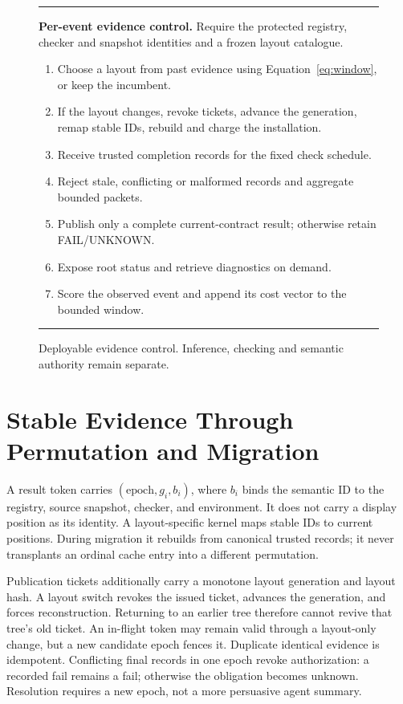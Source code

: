 \documentclass[11pt]{article}
\theoremstyle{definition}\newtheorem{definition}[theorem]{Definition}
\begin{document}
\begin{figure}[t]
\centering\begin{minipage}{.94\linewidth}
\hrule\medskip
\textbf{Per-event evidence control.} Require the protected registry, checker
and snapshot identities and a frozen layout catalogue.
\begin{enumerate}[leftmargin=1.8em,itemsep=2pt,topsep=3pt]
\item Choose a layout from past evidence using Equation~\eqref{eq:window}, or keep the incumbent.
\item If the layout changes, revoke tickets, advance the generation, remap stable IDs, rebuild and charge the installation.
\item Receive trusted completion records for the fixed check schedule.
\item Reject stale, conflicting or malformed records and aggregate bounded packets.
\item Publish only a complete current-contract result; otherwise retain FAIL/UNKNOWN.
\item Expose root status and retrieve diagnostics on demand.
\item Score the observed event and append its cost vector to the bounded window.
\end{enumerate}
\medskip\hrule
\end{minipage}
\caption{Deployable evidence control. Inference, checking and semantic authority remain separate.}
\end{figure}

\section{Stable Evidence Through Permutation and Migration}\label{sec:safety}
A result token carries $(\mathrm{epoch},g_i,b_i)$, where $b_i$ binds the semantic ID to the registry, source snapshot, checker, and environment. It does not carry a display position as its identity. A layout-specific kernel maps stable IDs to current positions. During migration it rebuilds from canonical trusted records; it never transplants an ordinal cache entry into a different permutation.

Publication tickets additionally carry a monotone layout generation and layout hash. A layout switch revokes the issued ticket, advances the generation, and forces reconstruction. Returning to an earlier tree therefore cannot revive that tree's old ticket. An in-flight token may remain valid through a layout-only change, but a new candidate epoch fences it. Duplicate identical evidence is idempotent. Conflicting final records in one epoch revoke authorization: a recorded fail remains a fail; otherwise the obligation becomes unknown. Resolution requires a new epoch, not a more persuasive agent summary.
\end{document}
